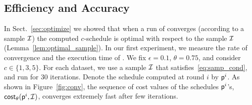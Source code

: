 




\subsection{Efficiency and Accuracy}
In Sect.~\ref{sec:optimize} we showed that when a run of \algonameapx converges
(according to a sample $\mathcal{I}$) the computed $c$-schedule is optimal with
respect to the sample $\mathcal{I}$ (Lemma~\ref{lem:optimal_sample}). In our first
experiment, we measure the rate of convergence and the execution time of
\algonameapx. We fix $\epsilon=0.1$, $\theta=0.75$, and consider
$c\in\{1,3,5\}$. For each dataset, we use a sample $\mathcal{I}$ that satisfies~\eqref{eq:samp_cond}, and run \algonameapx
for 30 iterations. Denote the schedule computed at round $i$ by $\mathsf{p}^i$.
As shown in Figure~\ref{fig:conv}, the sequence of cost values of the schedules
$\mathsf{p}^i$'s, $\mathsf{cost}_\theta(\mathsf{p}^i,\mathcal{I})$, converges extremely fast after few iterations.


